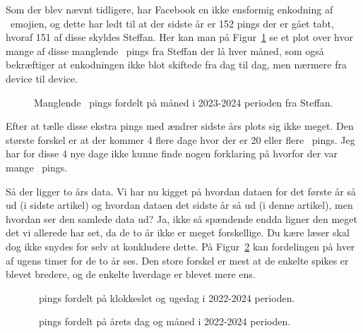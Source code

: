 \begin{article}
Som der blev nævnt tidligere, har Facebook en ikke ensformig enkodning af \coffee\ emojien, og dette har ledt til at der sidste år er 152 pings der er gået tabt, hvoraf 151 af disse skyldes Steffan. Her kan man på Figur~\ref{fig:month_analysis_2022-2023_steffan_missing} se et plot over hvor mange af disse manglende \coffee\ pings fra Steffan der lå hver måned, som også bekræftiger at enkodningen ikke blot skiftede fra dag til dag, men nærmere fra device til device.

\begin{figure}[H]
	\centering
	\resizebox{\columnwidth}{!}{}
	\vspace{-25pt}
	\caption{Manglende \protect\coffee\ pings fordelt på måned i 2023-2024 perioden fra Steffan.}
	\label{fig:month_analysis_2022-2023_steffan_missing}
\end{figure}

Efter at tælle disse ekstra pings med ændrer sidste års plots sig ikke meget. Den største forskel er at der kommer 4 flere dage hvor der er 20 eller flere \coffee\ pings. Jeg har for disse 4 nye dage ikke kunne finde nogen forklaring på hvorfor der var mange \coffee\ pings.


Så der ligger to års data. Vi har nu kigget på hvordan dataen for det første år så ud (i sidste artikel) og hvordan dataen det sidste år så ud (i denne artikel), men hvordan ser den samlede data ud? Ja, ikke så spændende endda ligner den meget det vi allerede har set, da de to år ikke er meget forskellige. Du kære læser skal dog ikke snydes for selv at konkludere dette. På Figur~\ref{fig:weekday_analysis_hour_2022-2024} kan fordelingen på hver af ugens timer for de to år ses. Den store forskel er mest at de enkelte spikes er blevet bredere, og de enkelte hverdage er blevet mere ens.

\begin{figure}[H]
	\centering
	\resizebox{\columnwidth}{!}{}
	\vspace{-25pt}
	\caption{\protect\coffee\ pings fordelt på klokkeslet og ugedag i 2022-2024 perioden.}
	\label{fig:weekday_analysis_hour_2022-2024}
\end{figure}
\begin{figure}[t!]
	\centering
	\resizebox{2\columnwidth}{!}{}
	\vspace{-20pt}
	\caption{\protect\coffee\ pings fordelt på årets dag og måned i 2022-2024 perioden.}
	\label{fig:year_analysis_2022-2024}
\end{figure}


\end{article}

